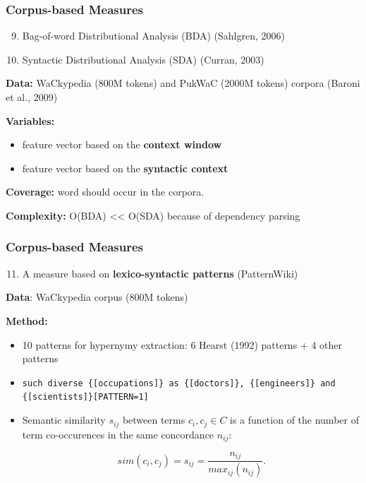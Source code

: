 \documentclass{beamer}
\begin{document}
\begin{frame}
\frametitle{Corpus-based Measures}

\begin{enumerate}
   \setcounter{enumi}{8}
	\item Bag-of-word Distributional Analysis (BDA) (Sahlgren, 2006) 
	\item Syntactic Distributional Analysis (SDA) (Curran, 2003) 
\end{enumerate}

\textbf{Data:} WaCkypedia (800M tokens) and PukWaC (2000M tokens) corpora (Baroni et al., 2009) 
 
\textbf{Variables:} 
\begin{itemize}
  \item feature vector based on the \textbf{context window}
  \item feature vector based on the \textbf{syntactic context} 
\end{itemize}

\textbf{Coverage:} word should occur in the corpora.

\textbf{Complexity:} O(BDA) << O(SDA) because of dependency parsing
	
\end{frame}

\begin{frame}
\frametitle{Corpus-based Measures }

\begin{enumerate}
  \setcounter{enumi}{10}
  \item A measure based on \textbf{lexico-syntactic patterns} (PatternWiki) 
\end{enumerate}	
 
\textbf{Data}: WaCkypedia corpus (800M tokens) 

\textbf{Method:}
\begin{itemize}
	\item 10 patterns for hypernymy extraction: 6 Hearst (1992) patterns + 4 other patterns
	\item \texttt{such diverse \{[occupations]\} as
  \{[doctors]\}, \{[engineers]\} and \{[scientists]\}[PATTERN=1]}
  
  \item Semantic similarity $s_{ij}$ between terms $c_i, c_j \in C$ is a function of 
 the number of term co-occurences in the same concordance $n_{ij}$:
  
   $$
   sim(c_i,c_j) = s_{ij} = \frac{n_{ij}}{max_{ij}(n_{ij})}.
   $$
\end{itemize}
 
 \end{frame}
 
\end{document}
